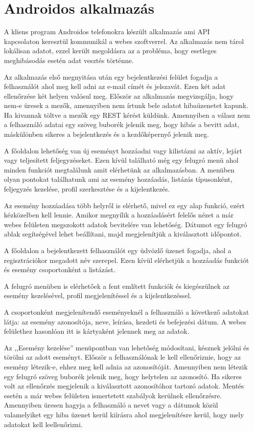 \documentclass[
]{thesis-ekf}
\theoremstyle{definition}
\theoremstyle{remark}
\begin{document}
\section{Androidos alkalmazás}
A kliens program Androidos telefonokra készült alkalmazás ami API~\cite{api_basic} kapcsolaton keresztül kommunikál a webes szoftverrel. Az alkalmazás nem tárol lokálisan adatot, ezzel került megoldásra az a probléma, hogy esetleges meghibásodás esetén adat vesztés történne. 

Az alkalmazás első megnyitása után egy bejelentkezési felület fogadja a felhasználót ahol meg kell adni az e-mail címét és jelszavát. Ezen két adat ellenőrzése két helyen valósul meg. Először az alkalmazás megvizsgálja, hogy nem-e üresek a mezők, amennyiben nem írtunk bele adatot hibaüzenetet kapunk. Ha kivannak töltve a mezők egy REST kérést küldünk. Amennyiben a válasz nem a felhasználó adatai egy szöveg buborék jelenik meg, hogy hibás a bevitt adat, máskülönben sikeres a bejelentkezés és a kezdőképernyő jelenik meg.

A főoldalon lehetőség van új eseményt hozzáadni vagy kilistázni az aktív, lejárt vagy teljesített feljegyzéseket. Ezen kívül található még egy felugró menü ahol minden funkciót megtalálunk amit elérhetünk az alkalmazásban. A menüben olyan pontokat találhatunk ami az esemény hozzáadás, listázás típusonként, feljegyzés kezelése, profil szerkesztése és a kijelentkezés. 

Az esemény hozzáadása több helyről is elérhető, mivel ez egy alap funkció, ezért kézközelben kell lennie. Amikor megnyílik a hozzáadásért felelős nézet a már webes felületen megszokott adatok bevitelére van lehetőség. Dátumot egy felugró ablak segítségével lehet beállítani, majd megjelenítjük a kiválasztott időpontot. 

A főoldalon a bejelentkezett felhasználót egy üdvözlő üzenet fogadja, ahol a regisztrációkor megadott név szerepel. Ezen kívül elérhetjük a hozzáadás funkciót és esemény csoportonként a listázást. 

A felugró menüben is elérhetőek a fent említett funkciók és kiegészülnek az esemény kezelésével, profil megjelenítéssel és a kijelentkezéssel. 

A csoportonként megjelenítendő eseményeknél a felhasználó a következő adatokat látja: az esemény azonosítója, neve, leírása, kezdeti és befejezési dátum. A webes felülethez hasonlóan itt is kártyaként jelennek meg az adatok. 

Az ,,Esemény kezelése'' menüpontban van lehetőség módosítani, késznek jelölni és törölni az adott eseményt. Először a felhasználónak le kell ellenőriznie, hogy az esemény létezik-e, ehhez meg kell adnia az azonosítóját. Amennyiben nem létezik egy felugró szöveg buborék jelenik meg, hogy helytelen az azonosító. Ha sikeres volt az ellenőrzés megjelenik a kiválasztott azonosítóhoz tartozó adatok. Mentés esetén a már webes felületen ismertetett szabályok kerülnek ellenőrzésre. Amennyiben üresen hagyja a felhasználó a nevet vagy a dátumok közül valamelyiket egy hiba üzenet kerül kiírásra ahol megjelenítésre kerül, hogy mely adatokat kell leellenőrizni. 
\end{document}
